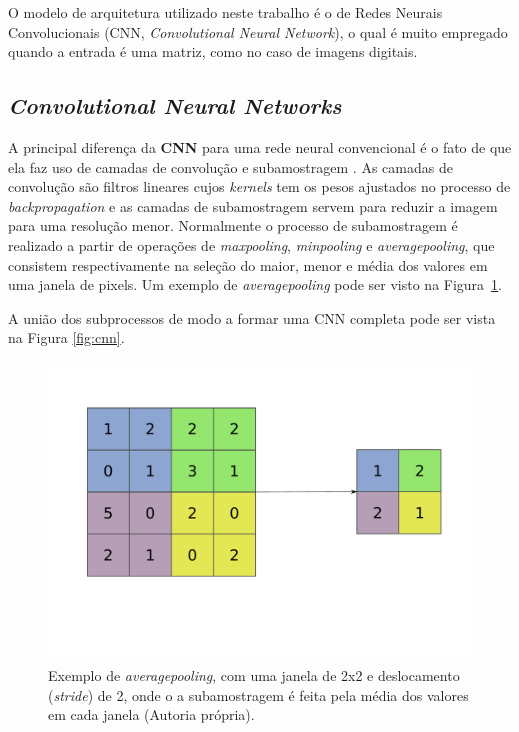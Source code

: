 O modelo de arquitetura utilizado neste trabalho é o de Redes Neurais Convolucionais (CNN, \textit{Convolutional Neural Network}), o qual é muito empregado quando a entrada é uma matriz, como no caso de imagens digitais.

\subsection{\textit{Convolutional Neural Networks}}
\label{subsec:cnn}

A principal diferença da \textbf{CNN} para uma rede neural convencional é o fato de que ela faz uso de camadas de convolução e subamostragem \cite{lecun2015deep}. As camadas de convolução são filtros lineares cujos \textit{kernels} tem os pesos ajustados no processo de \textit{backpropagation} e as camadas de subamostragem servem para reduzir a imagem para uma resolução menor. Normalmente o processo de subamostragem é realizado a partir de operações de \textit{maxpooling}, \textit{minpooling} e \textit{averagepooling}, que consistem respectivamente na seleção do maior, menor e média dos valores em uma janela de pixels. Um exemplo de \textit{averagepooling} pode ser visto na Figura~\ref{fig:average-pooling}.

A união dos subprocessos de modo a formar uma CNN completa pode ser vista na Figura \ref{fig:cnn}. 

\begin{figure}[!ht]
    \includegraphics[width=\textwidth]{dados/figuras/average-pooling.pdf}
    \caption{Exemplo de \textit{averagepooling}, com uma janela de 2x2 e deslocamento (\textit{stride}) de 2, onde o a subamostragem é feita pela média dos valores em cada janela (Autoria própria).}
	\label{fig:average-pooling}
\end{figure}

